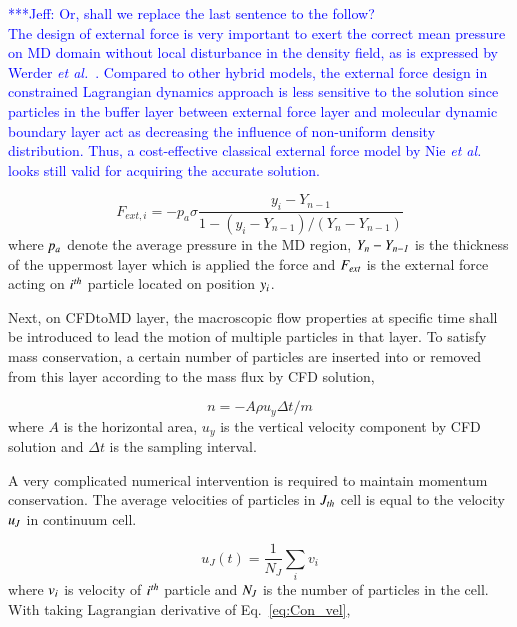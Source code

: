 \documentclass[preprint,12pt]{elsarticle}
\newcommand{\skonote}[1]{ {\textcolor{blue} { ***Jeff: #1 }}}
\newcommand{\skonote}[1]{}
\begin{document}
\skonote{Or, shall we replace the last sentence to the follow? \\
The design of external force is very important to exert the correct mean pressure on MD domain without local disturbance in the density field, as is expressed by Werder {\it{et al.}}~\cite{Werder}. Compared to other hybrid models, the external force design in constrained Lagrangian dynamics approach is less sensitive to the solution since particles in the buffer layer between external force layer and molecular dynamic boundary layer act as decreasing the influence of non-uniform density distribution. Thus, a cost-effective classical external force model by Nie {\it{et al.}}~\cite{Nie} looks still valid for acquiring the accurate solution.}


\vspace{-.2em}
\begin{equation}
 F_{ext, i} = -p_{a}\sigma\frac{y_{i}-Y_{n-1}}{1-(y_{i}-Y_{n-1})/(Y_{n}-Y_{n-1})}
 \label{eq:External_Force}
\end{equation}
\normalsize
where $\it p_{a}$ denote the average pressure in the MD region, $\it Y_{n}-Y_{n-1}$ is the thickness of the uppermost layer which is applied the force and $\it F_{ext}$ is the external force acting on $\it i^{th}$ particle located on position $\it y_{i}$.


Next, on CFDtoMD layer, the macroscopic flow properties at specific time shall be introduced to lead the motion of multiple particles in that layer. To satisfy mass conservation, a certain number of particles are inserted into or removed from this layer according to the mass flux by CFD solution,

\vspace{-.2em}
\begin{equation}
n = -A \rho u_y \Delta t / m
 \label{eq:Mass_Flux}
\end{equation}
\normalsize
where $A$ is the horizontal area, $u_y$ is the vertical velocity component by CFD solution and $\Delta t$ is the sampling interval.

A very complicated numerical intervention is required to maintain momentum conservation. The average velocities of particles in $\it J_{th}$ cell is equal to the velocity $\it u_{J}$ in continuum cell.

\vspace{-.2em}
\begin{equation}
 u_{J}(t) = \frac{1}{N_{J}} \displaystyle\sum_{i} v_{i}
 \label{eq:Con_vel}
\end{equation}
\normalsize
where $\it v_{i}$ is velocity of $\it i^{th}$ particle and $\it N_{J}$ is the number of particles in the cell. With taking Lagrangian derivative of Eq.~\ref{eq:Con_vel},
\end{document}
